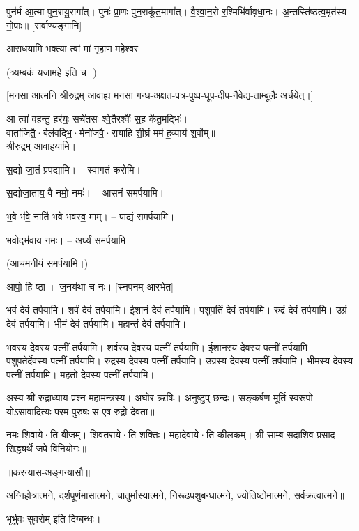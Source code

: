 पुन॑र्म आ॒त्मा पुन॒रायु॒रागा᳚त्। पुनः॑ प्रा॒णः पुन॒राकू॑त॒मागा᳚त्। वै॒श्वा॒न॒रो र॒श्मिभि॑र्वावृधा॒नः। अ॒न्तस्ति॑ष्ठत्व॒मृत॑स्य गो॒पाः॥ [सर्वाण्यङ्गानि]
{\small \closesection}


{आराधयामि भक्त्या त्वां मां गृहाण महेश्वर}

(त्र्यम्बकं यजामहे इति च।)

[मनसा आत्मनि श्रीरुद्रम् आवाह्य मनसा गन्ध-अक्षत-पत्र-पुष्प-धूप-दीप-नैवेद्य-ताम्बूलैः अर्चयेत्।]


आ त्वा॑ वहन्तु॒ हर॑यः॒ सचे॑तसः श्वे॒तैरश्वैः᳚ स॒ह के॑तु॒मद्भिः॑।\\
वाता॑जितै॒·र्बल॑वद्भि॒·र्मनो॑जवै॒·राया॑हि शी॒घ्रं मम॑ ह॒व्याय॑ श॒र्वोम्॥\\
श्रीरुद्रम् आवाहयामि।

स॒द्यो जा॒तं प्र॑पद्यामि। – स्वागतं करोमि।

स॒द्योजा॒ताय॒ वै नमो॒ नमः॑। – आसनं समर्पयामि।

भ॒वे भ॑वे॒ नाति॑ भवे भवस्व॒ माम्। – पाद्यं समर्पयामि।

भ॒वोद्भ॑वाय॒ नमः॑। – अर्घ्यं समर्पयामि।

(आचमनीयं समर्पयामि।)

आपो॒ हि ष्ठा + ज॒नय॑था च नः। [स्नपनम् आरभेत]

भवं देवं तर्पयामि। शर्वं देवं तर्पयामि। ईशानं देवं तर्पयामि। पशुपतिं देवं तर्पयामि। रुद्रं देवं तर्पयामि। उग्रं देवं तर्पयामि। भीमं देवं तर्पयामि। महान्तं देवं तर्पयामि।

भवस्य देवस्य पत्नीं तर्पयामि। शर्वस्य देवस्य पत्नीं तर्पयामि। ईशानस्य देवस्य पत्नीं तर्पयामि। पशुपतेर्देवस्य पत्नीं तर्पयामि। रुद्रस्य देवस्य पत्नीं तर्पयामि। उग्रस्य देवस्य पत्नीं तर्पयामि। भीमस्य देवस्य पत्नीं तर्पयामि। महतो देवस्य पत्नीं तर्पयामि।


अस्य श्री-रुद्राध्याय-प्रश्न-महामन्त्रस्य। अघोर ऋषिः। अनुष्टुप् छन्दः। सङ्कर्षण-मूर्ति-स्वरूपो योऽसावादित्यः परम-पुरुषः स एष रुद्रो देवता॥

नमः शिवाये·ति बीजम्। शिवतराये·ति शक्तिः। महादेवाये·ति कीलकम्। श्री-साम्ब-सदाशिव-प्रसाद-सिद्ध्यर्थे जपे विनियोगः॥

\centerline{॥करन्यास-अङ्गन्यासौ॥}
अग्निहोत्रात्मने, दर्शपूर्णमासात्मने, चातुर्मास्यात्मने, निरूढपशुबन्धात्मने, ज्योतिष्टोमात्मने, सर्वक्रत्वात्मने॥

भूर्भुवः सुवरोम् इति दिग्बन्धः।\\

